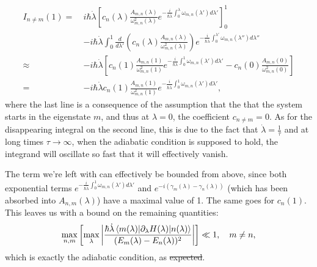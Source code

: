 \documentclass[a4paper,oneside,11pt]{book}
\newcommand{\dlambda}{\partial_{\lambda}}
\newcommand{\dotlambda}{\dot{\lambda}}
\providecommand{\DIFaddtex}[1]{{\protect\color{blue}\uwave{#1}}} %
\providecommand{\DIFdeltex}[1]{{\protect\color{red}\sout{#1}}}                      %
\providecommand{\DIFaddbegin}{} %
\providecommand{\DIFaddend}{} %
\providecommand{\DIFdelbegin}{} %
\providecommand{\DIFdelend}{} %
\providecommand{\DIFadd}[1]{\texorpdfstring{\DIFaddtex{#1}}{#1}} %
\providecommand{\DIFdel}[1]{\texorpdfstring{\DIFdeltex{#1}}{}} %
\newcommand{\DIFscaledelfig}{0.5}
\newlength{\DIFdelgraphicswidth} %
\newlength{\DIFdelgraphicsheight} %
\newcommand{\DIFaddincludegraphics}[2][]{{\color{blue}\fbox{\DIFOincludegraphics[#1]{#2}}}} %
\newcommand{\DIFdelincludegraphics}[2][]{%
\sbox{\DIFdelgraphicsbox}{\DIFOincludegraphics[#1]{#2}}%
\settoboxwidth{\DIFdelgraphicswidth}{\DIFdelgraphicsbox} %
\settoboxtotalheight{\DIFdelgraphicsheight}{\DIFdelgraphicsbox} %
\scalebox{\DIFscaledelfig}{%
\parbox[b]{\DIFdelgraphicswidth}{\usebox{\DIFdelgraphicsbox}\\[-\baselineskip] \rule{\DIFdelgraphicswidth}{0em}}\llap{\resizebox{\DIFdelgraphicswidth}{\DIFdelgraphicsheight}{%
\setlength{\unitlength}{\DIFdelgraphicswidth}%
\begin{picture}(1,1)%
\thicklines\linethickness{2pt} %
{\color[rgb]{1,0,0}\put(0,0){\framebox(1,1){}}}%
{\color[rgb]{1,0,0}\put(0,0){\line( 1,1){1}}}%
{\color[rgb]{1,0,0}\put(0,1){\line(1,-1){1}}}%
\end{picture}%
}\hspace*{3pt}}} %
} %
\DeclareRobustCommand{\DIFaddbegin}{\DIFOaddbegin \let\includegraphics\DIFaddincludegraphics} %
\DeclareRobustCommand{\DIFaddend}{\DIFOaddend \let\includegraphics\DIFOincludegraphics} %
\DeclareRobustCommand{\DIFdelbegin}{\DIFOdelbegin \let\includegraphics\DIFdelincludegraphics} %
\DeclareRobustCommand{\DIFdelend}{\DIFOaddend \let\includegraphics\DIFOincludegraphics} %
\begin{document}
    \begin{equation}\label{eq:final_adiabatic_integral}
        \begin{aligned}
            I_{n \neq m}(1) = \: &i\hbar \dotlambda \left[ c_n(\lambda) \frac{A_{m,n}(\lambda)}{\omega_{m,n}^2(\lambda)} e^{-\frac{i}{\hbar \dotlambda}\int_0^{\lambda}\omega_{m,n}(\lambda')d \lambda'}  \right]_0^1 \\ 
            \quad &-i\hbar \dotlambda \int_0^1 \frac{d}{d\lambda'} \left(c_n(\lambda) \frac{A_{m,n}(\lambda)}{\omega_{m,n}^2(\lambda)} \right) e^{-\frac{i}{\hbar \dotlambda}\int_0^{\lambda'}\omega_{m,n}(\lambda'')d \lambda''} \\
            \approx &-i\hbar \dotlambda \left[ c_n(1) \frac{A_{m,n}(1)}{\omega_{m,n}^2(1)}e^{-\frac{i}{\hbar \dotlambda}\int_0^{1}\omega_{m,n}(\lambda')d \lambda'} - c_n(0) \frac{A_{m,n}(0)}{\omega_{m,n}^2(0)} \right] \\
            = &-i\hbar \dotlambda c_n(1) \frac{A_{m,n}(1)}{\omega_{m,n}^2(1)}e^{-\frac{i}{\hbar \dotlambda}\int_0^{1}\omega_{m,n}(\lambda')d \lambda'},
        \end{aligned}
    \end{equation}
    where the last line is a consequence of the assumption that the that the system starts in the eigenstate $m$, and thus at $\lambda = 0$, the coefficient $c_{n \neq m} = 0$. As for the disappearing integral on the second line, this is due to the fact that $\dotlambda = \frac{1}{\tau}$ and at long times $\tau \rightarrow \infty$, when the adiabatic condition is supposed to hold, the integrand will oscillate so fast that it will effectively vanish\cite{kahane_generalizations_1980}. 

    The term we're left with can effectively be bounded from above, since both exponential terms $e^{-\frac{i}{\hbar \dotlambda}\int_0^{1}\omega_{m,n}(\lambda')d \lambda'}$ and $e^{-i(\gamma_m(\lambda) - \gamma_n(\lambda))}$ (which has been absorbed into $A_{n,m}(\lambda)$) have a maximal value of 1. The same goes for $c_n(1)$. This leaves us with a bound on the remaining quantities:
    \begin{equation}\label{eq:adiabatic_criterion}
        \max _{n,m}\left[\max_{\lambda} \left| \frac{\hbar \dotlambda \mel{m(\lambda)}{\dlambda H(\lambda)}{n(\lambda)}}{(E_m(\lambda) - E_n(\lambda))^2} \right| \right] \ll 1, \quad m \neq n,
    \end{equation}
    which is exactly the adiabatic condition, as \DIFdelbegin \DIFdel{expected}\DIFdelend \DIFaddbegin \DIFadd{required}\DIFaddend . 
\end{document}

